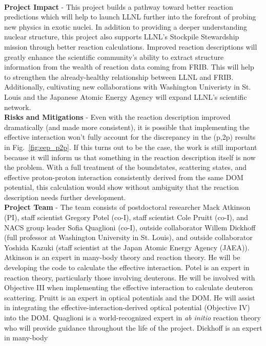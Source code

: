 \documentclass[12pt]{article}
\begin{document}
\\
\textbf{Project Impact}
 - This project builds a pathway toward better reaction predictions which will help to launch LLNL further into the forefront of probing new physics in exotic nuclei. In addition
 to providing a deeper understanding nuclear structure, this project also supports LLNL's Stockpile Stewardship mission through better reaction calculations. Improved
 reaction descriptions will greatly enhance the scientific community's ability to extract structure information from the wealth of reaction data coming from FRIB. This will help to
 strengthen the already-healthy relationship between LLNL and FRIB. Additionally, cultivating new collaborations with Washington Univeristy in St. Louis and the Japanese Atomic
 Energy Agency will expand LLNL's scientific network.   
\\
\textbf{Risks and Mitigations}
 - Even with the reaction description improved dramatically (and made more consistent), it is possible that implementing the effective interaction won't
fully account for the discrepancy in the (p,2p) results in Fig.~\ref{fig:eep_p2p}. If this turns out to be the case, the work is still important because it will inform us that
something in the reaction description itself is now the problem. With a full treatment of the boundstates, scattering states, and effective proton-proton interaction consistently
derived from the same DOM potential, this calculation would show without ambiguity that the reaction description needs further development.
\\
\textbf{Project Team}  - The team consists of postdoctoral researcher Mack Atkinson (PI), staff scientist Gregory Potel (co-I), staff scientist Cole Pruitt (co-I), and NACS group
leader Sofia Quaglioni (co-I), outside collaborator Willem Dickhoff (full professor at Washington University in St. Louis), and outside collaborator Yoshida Kazuki (staff
scientist at the Japan Atomic Energy Agency (JAEA)). Atkinson is an expert in many-body theory and reaction theory. He will be developing the code to calculate the effective interaction. Potel is an
expert in reaction theory, particularly those involving deuterons. He will be involved with Objective III when implementing the effective interaction to calculate deuteron
scattering. Pruitt is an expert in optical potentials and the DOM. He will assist in integrating the effective-interaction-derived optical potential (Objective IV) into the DOM.
Quaglioni is a world-recognized expert in \textit{ab initio} reaction theory who will provide guidance throughout the life of the project. Dickhoff is an expert in many-body
\end{document}
